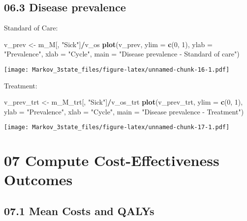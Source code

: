 \documentclass[
]{article}
\newenvironment{Shaded}{\begin{snugshade}}{\end{snugshade}}
\newcommand{\DataTypeTok}[1]{\textcolor[rgb]{0.13,0.29,0.53}{#1}}
\newcommand{\DecValTok}[1]{\textcolor[rgb]{0.00,0.00,0.81}{#1}}
\newcommand{\KeywordTok}[1]{\textcolor[rgb]{0.13,0.29,0.53}{\textbf{#1}}}
\newcommand{\NormalTok}[1]{#1}
\newcommand{\OperatorTok}[1]{\textcolor[rgb]{0.81,0.36,0.00}{\textbf{#1}}}
\newcommand{\StringTok}[1]{\textcolor[rgb]{0.31,0.60,0.02}{#1}}
\begin{document}
\hypertarget{disease-prevalence}{%
\subsection{06.3 Disease prevalence}\label{disease-prevalence}}

Standard of Care:

\begin{Shaded}
\begin{Highlighting}[]
\NormalTok{v_prev <-}\StringTok{ }\NormalTok{m_M[, }\StringTok{"Sick"}\NormalTok{]}\OperatorTok{/}\NormalTok{v_os}
\KeywordTok{plot}\NormalTok{(v_prev,}
     \DataTypeTok{ylim =} \KeywordTok{c}\NormalTok{(}\DecValTok{0}\NormalTok{, }\DecValTok{1}\NormalTok{),}
     \DataTypeTok{ylab =} \StringTok{"Prevalence"}\NormalTok{,}
     \DataTypeTok{xlab =} \StringTok{"Cycle"}\NormalTok{,}
     \DataTypeTok{main =} \StringTok{"Disease prevalence - Standard of care"}\NormalTok{)}
\end{Highlighting}
\end{Shaded}

\texttt{[image: Markov\_3state\_files/figure-latex/unnamed-chunk-16-1.pdf]}

Treatment:

\begin{Shaded}
\begin{Highlighting}[]
\NormalTok{v_prev_trt <-}\StringTok{ }\NormalTok{m_M_trt[, }\StringTok{"Sick"}\NormalTok{]}\OperatorTok{/}\NormalTok{v_os_trt}
\KeywordTok{plot}\NormalTok{(v_prev_trt,}
     \DataTypeTok{ylim =} \KeywordTok{c}\NormalTok{(}\DecValTok{0}\NormalTok{, }\DecValTok{1}\NormalTok{),}
     \DataTypeTok{ylab =} \StringTok{"Prevalence"}\NormalTok{,}
     \DataTypeTok{xlab =} \StringTok{"Cycle"}\NormalTok{,}
     \DataTypeTok{main =} \StringTok{"Disease prevalence - Treatment"}\NormalTok{)}
\end{Highlighting}
\end{Shaded}

\texttt{[image: Markov\_3state\_files/figure-latex/unnamed-chunk-17-1.pdf]}

\hypertarget{compute-cost-effectiveness-outcomes}{%
\section{07 Compute Cost-Effectiveness
Outcomes}\label{compute-cost-effectiveness-outcomes}}

\hypertarget{mean-costs-and-qalys}{%
\subsection{07.1 Mean Costs and QALYs}\label{mean-costs-and-qalys}}
\end{document}
